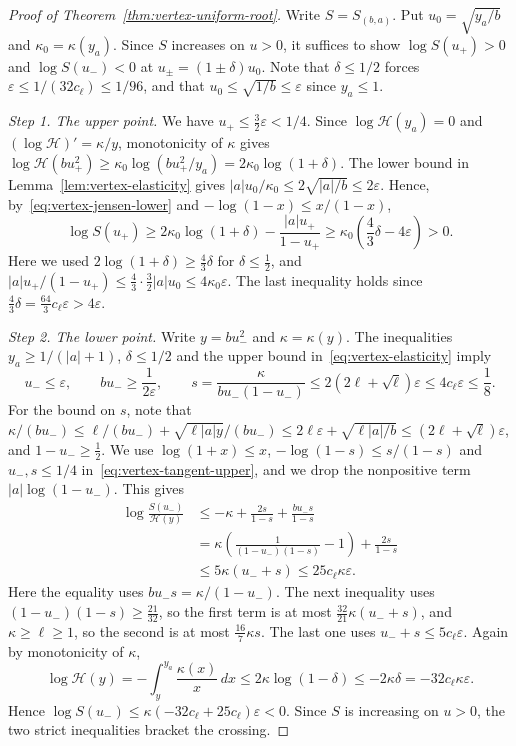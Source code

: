\begin{proof}[Proof of Theorem~\ref{thm:vertex-uniform-root}]
Write $S=S_{(b,a)}$. Put $u_0=\sqrt{y_a/b}$ and $\kappa_0=\kappa(y_a)$. Since
$S$ increases on $u>0$, it suffices to show $\log S(u_+)>0$ and
$\log S(u_-)<0$ at $u_\pm=(1\pm\delta)u_0$. Note that $\delta\le1/2$ forces
$\varepsilon\le1/(32c_\ell)\le1/96$, and that $u_0\le\sqrt{1/b}\le\varepsilon$
since $y_a\le1$.

\emph{Step 1. The upper point.} We have $u_+\le\tfrac32\varepsilon<1/4$. Since
$\log\mathcal H(y_a)=0$ and $(\log\mathcal H)'=\kappa/y$, monotonicity of $\kappa$ gives
$\log\mathcal H(bu_+^2)\ge\kappa_0\log(bu_+^2/y_a)=2\kappa_0\log(1+\delta)$. The lower
bound in Lemma~\ref{lem:vertex-elasticity} gives
$|a|u_0/\kappa_0\le2\sqrt{|a|/b}\le2\varepsilon$. Hence,
by~\eqref{eq:vertex-jensen-lower} and $-\log(1-x)\le x/(1-x)$,
\[
 \log S(u_+)\ge
 2\kappa_0\log(1+\delta)-\frac{|a|u_+}{1-u_+}
 \ge\kappa_0\left(\frac43\delta-4\varepsilon\right)>0.
\]
Here we used $2\log(1+\delta)\ge\frac43\delta$ for $\delta\le\frac12$, and
$|a|u_+/(1-u_+)\le\frac43\cdot\frac32|a|u_0\le4\kappa_0\varepsilon$. The last
inequality holds since $\frac43\delta=\frac{64}3c_\ell\varepsilon>4\varepsilon$.

\emph{Step 2. The lower point.} Write $y=bu_-^2$ and $\kappa=\kappa(y)$. The
inequalities $y_a\ge1/(|a|+1)$, $\delta\le1/2$ and the upper bound
in~\eqref{eq:vertex-elasticity} imply
\[
 u_-\le\varepsilon,\qquad bu_-\ge\frac1{2\varepsilon},\qquad
 s=\frac{\kappa}{bu_-(1-u_-)}
 \le 2(2\ell+\sqrt\ell)\varepsilon\le4c_\ell\varepsilon\le\frac18.
\]
For the bound on $s$, note that
$\kappa/(bu_-)\le\ell/(bu_-)+\sqrt{\ell|a|y}/(bu_-)\le2\ell\varepsilon+\sqrt{\ell|a|/b}
\le(2\ell+\sqrt\ell)\varepsilon$, and $1-u_-\ge\frac12$. We use
$\log(1+x)\le x$, $-\log(1-s)\le s/(1-s)$ and $u_-,s\le1/4$
in~\eqref{eq:vertex-tangent-upper}, and we drop the nonpositive term
$|a|\log(1-u_-)$. This gives
\begin{align*}
 \log\frac{S(u_-)}{\mathcal H(y)}
 &\le -\kappa+\frac{2s}{1-s}+\frac{bu_-s}{1-s}\\
 &=\kappa\left(\frac1{(1-u_-)(1-s)}-1\right)
       +\frac{2s}{1-s}\\
 &\le 5\kappa(u_-+s)\le25c_\ell\kappa\varepsilon.
\end{align*}
Here the equality uses $bu_-s=\kappa/(1-u_-)$. The next inequality uses
$(1-u_-)(1-s)\ge\frac{21}{32}$, so the first term is at most
$\frac{32}{21}\kappa(u_-+s)$, and $\kappa\ge\ell\ge1$, so the second is at most
$\frac{16}7\kappa s$. The last one uses $u_-+s\le5c_\ell\varepsilon$. Again by
monotonicity of $\kappa$,
\[
 \log\mathcal H(y)=-\int_y^{y_a}\frac{\kappa(x)}x\,dx\le2\kappa\log(1-\delta)\le-2\kappa\delta
 =-32c_\ell\kappa\varepsilon.
\]
Hence $\log S(u_-)\le\kappa(-32c_\ell+25c_\ell)\varepsilon<0$. Since $S$ is
increasing on $u>0$, the two strict inequalities bracket the crossing.
\end{proof}
